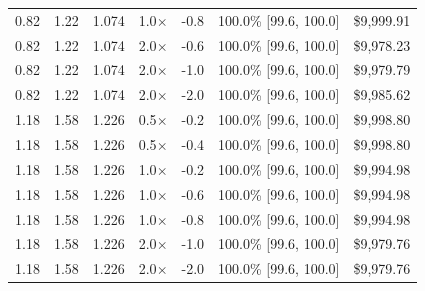 \begin{table}[htbp]
\begin{tabular}{lrrrrrr}
0.82 & 1.22 & 1.074 & 1.0$\times$ & -0.8 & 100.0\% [99.6, 100.0] & \$9,999.91 \\
0.82 & 1.22 & 1.074 & 2.0$\times$ & -0.6 & 100.0\% [99.6, 100.0] & \$9,978.23 \\
0.82 & 1.22 & 1.074 & 2.0$\times$ & -1.0 & 100.0\% [99.6, 100.0] & \$9,979.79 \\
0.82 & 1.22 & 1.074 & 2.0$\times$ & -2.0 & 100.0\% [99.6, 100.0] & \$9,985.62 \\
\midrule
1.18 & 1.58 & 1.226 & 0.5$\times$ & -0.2 & 100.0\% [99.6, 100.0] & \$9,998.80 \\
1.18 & 1.58 & 1.226 & 0.5$\times$ & -0.4 & 100.0\% [99.6, 100.0] & \$9,998.80 \\
1.18 & 1.58 & 1.226 & 1.0$\times$ & -0.2 & 100.0\% [99.6, 100.0] & \$9,994.98 \\
1.18 & 1.58 & 1.226 & 1.0$\times$ & -0.6 & 100.0\% [99.6, 100.0] & \$9,994.98 \\
1.18 & 1.58 & 1.226 & 1.0$\times$ & -0.8 & 100.0\% [99.6, 100.0] & \$9,994.98 \\
1.18 & 1.58 & 1.226 & 2.0$\times$ & -1.0 & 100.0\% [99.6, 100.0] & \$9,979.76 \\
1.18 & 1.58 & 1.226 & 2.0$\times$ & -2.0 & 100.0\% [99.6, 100.0] & \$9,979.76 \\
\bottomrule
\end{tabular}
\end{table}
